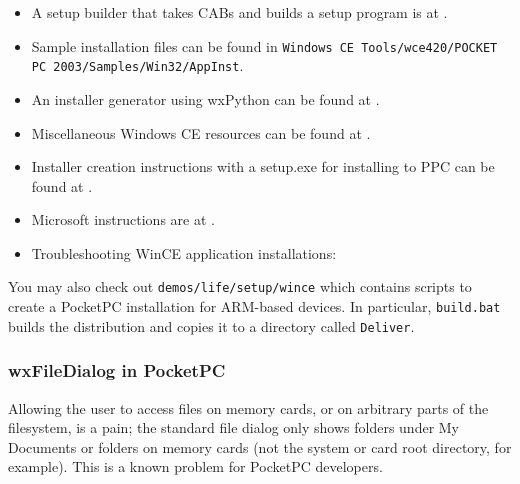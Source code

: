 \itemsep=0pt
\begin{itemize}
\item A setup builder that takes CABs and builds a setup program is at .
\item Sample installation files can be found in {\tt Windows CE Tools/wce420/POCKET PC 2003/Samples/Win32/AppInst}.
\item An installer generator using wxPython can be found at .
\item Miscellaneous Windows CE resources can be found at .
\item Installer creation instructions with a setup.exe for installing to PPC can be found at .
\item Microsoft instructions are at .
\item Troubleshooting WinCE application installations: 
\end{itemize}

You may also check out {\tt demos/life/setup/wince} which contains
scripts to create a PocketPC installation for ARM-based
devices. In particular, {\tt build.bat} builds the distribution and
copies it to a directory called {\tt Deliver}.

\subsubsection{wxFileDialog in PocketPC}

Allowing the user to access files on memory cards, or on arbitrary
parts of the filesystem, is a pain; the standard file dialog only
shows folders under My Documents or folders on memory cards
(not the system or card root directory, for example). This is
a known problem for PocketPC developers.

